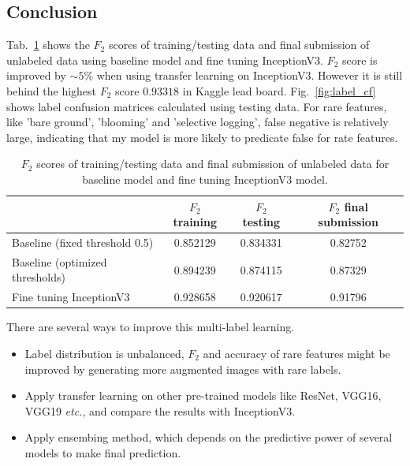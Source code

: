 \documentclass[11pt,oneside,a4paper]{article}
\begin{document}
\subsection{Conclusion}
Tab.~\ref{tab:conclusion} shows the $F_2$ scores of training/testing data and final submission of unlabeled data using baseline model and fine tuning InceptionV3. $F_2$ score is improved by $\sim5\%$ when using transfer learning on InceptionV3. However it is still behind the highest $F_2$ score $0.93318$ in Kaggle lead board. Fig.~\ref{fig:label_cf} shows label confusion matrices calculated using testing data. For rare features, like 'bare ground', 'blooming' and 'selective logging', false negative is relatively large, indicating that my model is more likely to predicate false for rate features.

\begin{table}[ht]
\begin{tabular}{l|c|c|c}
\hline
\hline
                          &  $F_2$ training & $F_2$ testing & $F_2$ final submission \\
 \hline
Baseline (fixed threshold 0.5)           &  0.852129       &  0.834331  & 0.82752 \\
Baseline (optimized thresholds)          &  0.894239       & 0.874115      & 0.87329 \\
Fine tuning InceptionV3   &  0.928658       & 0.920617      & 0.91796 \\\hline
\end{tabular}
\caption{$F_2$ scores of training/testing data and final submission of unlabeled data for baseline model and fine tuning InceptionV3 model.}\label{tab:conclusion}
\end{table}

There are several ways to improve this multi-label learning. 
\begin{itemize}
\item Label distribution is unbalanced, $F_2$ and accuracy of rare features might be improved by generating more augmented images with rare labels.
\item Apply transfer learning on other pre-trained models like ResNet, VGG16, VGG19 \emph{etc.}, and compare the results with InceptionV3.
\item Apply ensembing method, which depends on  the  predictive  power of several models to make final prediction. 
\end{itemize}

\end{document}
